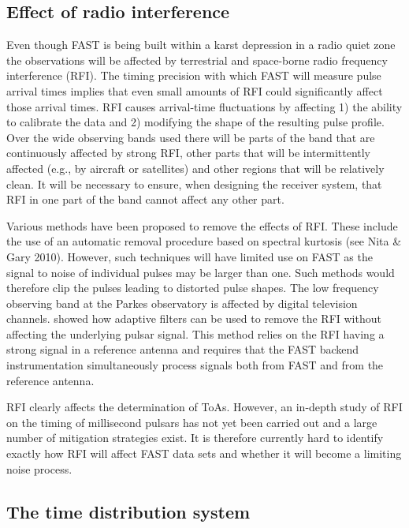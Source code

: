 \documentclass{raa}            %
\begin{document}
\subsection{Effect of radio interference}

Even though FAST is being built within a karst depression in a radio quiet zone \citep{nlj+11} the observations will be affected by terrestrial and space-borne radio frequency interference (RFI).   The timing precision with which FAST will measure pulse arrival times implies that even small amounts of RFI could significantly affect those arrival times.  RFI causes arrival-time fluctuations by affecting 1) the ability to calibrate the data and 2) modifying the shape of the resulting pulse profile.  Over the wide observing bands used there will be parts of the band that are continuously affected by strong RFI, other parts that will be intermittently affected (e.g., by aircraft or satellites) and other regions that will be relatively clean.  It will be necessary to ensure, when designing the receiver system, that RFI in one part of the band cannot affect any other part.  

Various methods have been proposed to remove the effects of RFI.  These include the use of an automatic removal procedure based on spectral kurtosis (see Nita \& Gary 2010\nocite{ng10}).  However, such techniques will have limited use on FAST as the signal to noise of individual pulses may be larger than one.  Such methods would therefore clip the pulses leading to distorted pulse shapes.  The low frequency observing band at the Parkes observatory is affected by digital television channels.  \cite{khc+05} showed how adaptive filters can be used to remove the RFI without affecting the underlying pulsar signal.  This method relies on the RFI having a strong signal in a reference antenna and requires that the FAST backend instrumentation simultaneously process signals both from FAST and from the reference antenna.

RFI clearly affects the determination of ToAs. However, an in-depth study of RFI on the timing of millisecond pulsars has not yet been carried out and a large number of mitigation strategies exist.  It is therefore currently hard to identify exactly how RFI will affect FAST data sets and whether it will become a limiting noise process.

\subsection{The time distribution system}
\end{document}
